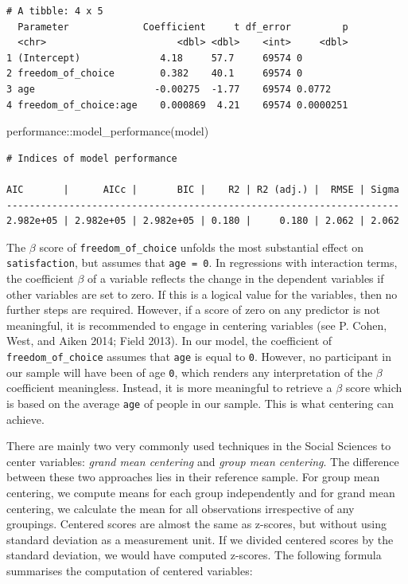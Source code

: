 \documentclass[
  letterpaper,
]{krantz}
\makeatletter
\newenvironment{Shaded}{\begin{snugshade}}{\end{snugshade}}
\newcommand{\FunctionTok}[1]{\textcolor[rgb]{0.28,0.35,0.67}{#1}}
\newcommand{\NormalTok}[1]{\textcolor[rgb]{0.00,0.23,0.31}{#1}}
\newcommand{\SpecialCharTok}[1]{\textcolor[rgb]{0.37,0.37,0.37}{#1}}
\newenvironment{kframe}{%
\medskip{}
\setlength{\fboxsep}{.8em}
 \def\at@end@of@kframe{}%
 \ifinner\ifhmode%
  \def\at@end@of@kframe{\end{minipage}}%
  \begin{minipage}{\columnwidth}%
 \fi\fi%
 \def\FrameCommand##1{\hskip\@totalleftmargin \hskip-\fboxsep
 \colorbox{shadecolor}{##1}\hskip-\fboxsep
     \hskip-\linewidth \hskip-\@totalleftmargin \hskip\columnwidth}%
 \MakeFramed {\advance\hsize-\width
   \@totalleftmargin\z@ \linewidth\hsize
   \@setminipage}}%
 {\par\unskip\endMakeFramed%
 \at@end@of@kframe}
\renewenvironment{Shaded}{\begin{kframe}}{\end{kframe}}
\makeatother
\begin{document}
\begin{verbatim}
# A tibble: 4 x 5
  Parameter             Coefficient     t df_error         p
  <chr>                       <dbl> <dbl>    <int>     <dbl>
1 (Intercept)              4.18     57.7     69574 0        
2 freedom_of_choice        0.382    40.1     69574 0        
3 age                     -0.00275  -1.77    69574 0.0772   
4 freedom_of_choice:age    0.000869  4.21    69574 0.0000251
\end{verbatim}

\begin{Shaded}
\begin{Highlighting}[]
\NormalTok{performance}\SpecialCharTok{::}\FunctionTok{model\_performance}\NormalTok{(model)}
\end{Highlighting}
\end{Shaded}

\begin{verbatim}
# Indices of model performance

AIC       |      AICc |       BIC |    R2 | R2 (adj.) |  RMSE | Sigma
---------------------------------------------------------------------
2.982e+05 | 2.982e+05 | 2.982e+05 | 0.180 |     0.180 | 2.062 | 2.062
\end{verbatim}

The \(\beta\) score of \texttt{freedom\_of\_choice} unfolds the most
substantial effect on \texttt{satisfaction}, but assumes that
\texttt{age\ =\ 0}. In regressions with interaction terms, the
coefficient \(\beta\) of a variable reflects the change in the dependent
variables if other variables are set to zero. If this is a logical value
for the variables, then no further steps are required. However, if a
score of zero on any predictor is not meaningful, it is recommended to
engage in centering variables (see P. Cohen, West, and Aiken 2014; Field
2013). In our model, the coefficient of \texttt{freedom\_of\_choice}
assumes that \texttt{age} is equal to \texttt{0}. However, no
participant in our sample will have been of age \texttt{0}, which
renders any interpretation of the \(\beta\) coefficient meaningless.
Instead, it is more meaningful to retrieve a \(\beta\) score which is
based on the average \texttt{age} of people in our sample. This is what
centering can achieve.

There are mainly two very commonly used techniques in the Social
Sciences to center variables: \emph{grand mean centering} and
\emph{group mean centering}. The difference between these two approaches
lies in their reference sample. For group mean centering, we compute
means for each group independently and for grand mean centering, we
calculate the mean for all observations irrespective of any groupings.
Centered scores are almost the same as z-scores, but without using
standard deviation as a measurement unit. If we divided centered scores
by the standard deviation, we would have computed z-scores. The
following formula summarises the computation of centered variables:
\end{document}
